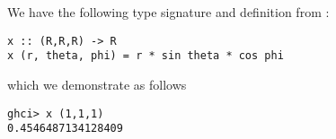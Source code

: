 
We have the following type signature and definition from :
\begin{verbatim}
x :: (R,R,R) -> R
x (r, theta, phi) = r * sin theta * cos phi
\end{verbatim}
which we demonstrate as follows
\begin{verbatim}
ghci> x (1,1,1)
0.4546487134128409
\end{verbatim}

